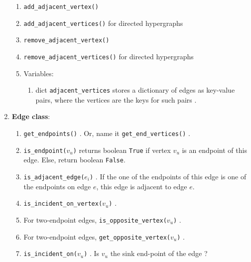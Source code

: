 \begin{enumerate}
\begin{enumerate}
	\item {\tt add\_adjacent\_vertex()}
	\item {\tt add\_adjacent\_vertices()} for directed hypergraphs
	\item {\tt remove\_adjacent\_vertex()}
	\item {\tt remove\_adjacent\_vertices()} for directed hypergraphs
	\item Variables: \vspace{-0.2cm}
		\begin{enumerate} \itemsep -2pt
		\item dict {\tt adjacent\_vertices} stores a dictionary of edges as key-value pairs, where the vertices are the keys for such pairs \cite[\S14.2, pp. 627; \S14.2.3, pp. 632; \S14.2.5, pp. 634--637]{Goodrich2013}. 
		\end{enumerate}
	\end{enumerate}
\item {\bf Edge class}: \vspace{-0.3cm}
	\begin{enumerate} \itemsep -2pt
	\item {\tt get\_endpoints()} \cite[\S14.1.1, pp. 626]{Goodrich2013}. Or, name it {\tt get\_end\_vertices()} \cite[\S13.1.1, pp. 599]{Goodrich2011}.
	\item {\tt is\_endpoint($v_{u}$)} returns boolean {\tt True} if vertex $v_{u}$ is an endpoint of this edge. Else, return boolean {\tt False}.
	\item {\tt is\_adjacent\_edge($e_{i}$)} \cite[\S13.1.1, pp. 599]{Goodrich2011}. If the one of the endpoints of this edge is one of the endpoints on edge $e$, this edge is adjacent to edge $e$.
	\item {\tt is\_incident\_on\_vertex($v_{u}$)} \cite[\S13.1.1, pp. 599]{Goodrich2011}.
	\item For two-endpoint edges, {\tt is\_opposite\_vertex($v_{u}$)} \cite[\S13.1.1, pp. 599]{Goodrich2011}.
	\item For two-endpoint edges, {\tt get\_opposite\_vertex($v_{u}$)} \cite[\S13.1.1, pp. 599]{Goodrich2011} \cite[\S14.1.1, pp. 626]{Goodrich2013}.
	\item {\tt is\_incident\_on($v_{u}$)} \cite[\S13.1.1, pp. 599]{Goodrich2011}. Is $v_{u}$ the sink end-point of the edge \cite[\S13.1.1, pp. 599]{Goodrich2011}?
	\end{enumerate}
\end{enumerate}

